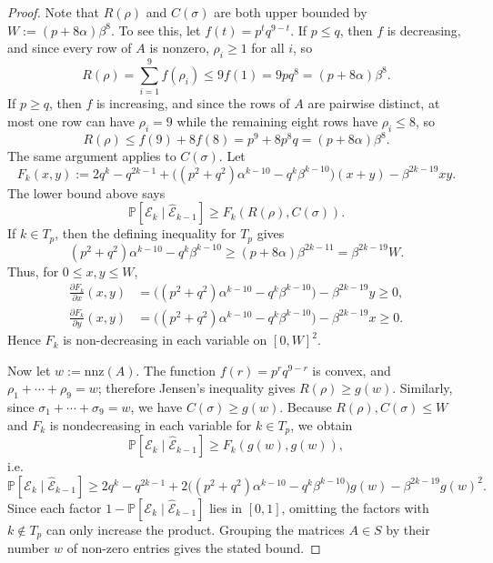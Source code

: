\documentclass[10pt,a4paper]{amsart}
\begin{document}
\begin{proof}
Note that $R(\rho)$ and $C(\sigma)$ are both upper bounded by $W:=(p + 8 \alpha) \beta^8$. To see this, let $f(t)=p^tq^{9-t}$. If $p\le q$, then $f$ is decreasing, and since every row of $A$ is nonzero, $\rho_i\ge1$ for all $i$, so
\[R(\rho)=\sum_{i=1}^9 f(\rho_i)\le 9f(1)=9pq^8=(p+8\alpha)\beta^8.\]
If $p\ge q$, then $f$ is increasing, and since the rows of $A$ are pairwise distinct, at most one row can have $\rho_i=9$ while the remaining eight rows have $\rho_i\le8$, so
\[R(\rho)\le f(9)+8f(8)=p^9+8p^8q=(p+8\alpha)\beta^8.\]
The same argument applies to $C(\sigma)$. Let
\[F_k(x,y):=2q^k-q^{2k-1}+\big((p^2+q^2)\alpha^{k-10}-q^k\beta^{k-10}\big)(x+y)-\beta^{2k-19}xy.\]
The lower bound above says
\[\mathbb{P}\left[\mathcal E_k\mid \mathcal{\hat E}_{k-1}\right] \ge F_k(R(\rho),C(\sigma)).\]
If $k\in T_p$, then the defining inequality for $T_p$ gives
\[(p^2+q^2)\alpha^{k-10}-q^k\beta^{k-10} \ge (p+8\alpha)\beta^{2k-11}=\beta^{2k-19}W.\]
Thus, for $0\le x,y\le W$,
\begin{align*}
    \frac{\partial F_k}{\partial x}(x,y)&=\big((p^2+q^2)\alpha^{k-10}-q^k\beta^{k-10}\big)-\beta^{2k-19}y\ge0, \\
    \frac{\partial F_k}{\partial y}(x,y)&=\big((p^2+q^2)\alpha^{k-10}-q^k\beta^{k-10}\big)-\beta^{2k-19}x\ge0.
\end{align*}
Hence $F_k$ is non-decreasing in each variable on $[0,W]^2$.

Now let $w:=\mathrm{nnz}(A)$. The function $f(r)=p^r q^{9-r}$ is convex, and $\rho_1+\cdots+\rho_9=w$; therefore Jensen's inequality gives $R(\rho)\ge g(w)$. Similarly, since $\sigma_1+\cdots+\sigma_9=w$, we have $C(\sigma)\ge g(w)$. Because $R(\rho),C(\sigma)\le W$ and $F_k$ is nondecreasing in each variable for $k\in T_p$, we obtain
\[\mathbb{P}\left[\mathcal E_k\mid \mathcal{\hat E}_{k-1}\right] \ge F_k(g(w),g(w)),\]
i.e.
\[\mathbb{P}\left[\mathcal E_k\mid \mathcal{\hat E}_{k-1}\right] \ge 2q^k -q^{2k-1} +2\big((p^2 + q^2) \alpha^{k-10} - q^k \beta^{k-10}\big) g(w) -\beta^{2k-19}g(w)^2.\]
Since each factor $1-\mathbb{P}[\mathcal E_k\mid \mathcal{\hat E}_{k-1}]$ lies in $[0,1]$, omitting the factors with $k\notin T_p$ can only increase the product. Grouping the matrices $A\in S$ by their number $w$ of non-zero entries gives the stated bound.\end{proof}
\end{document}
